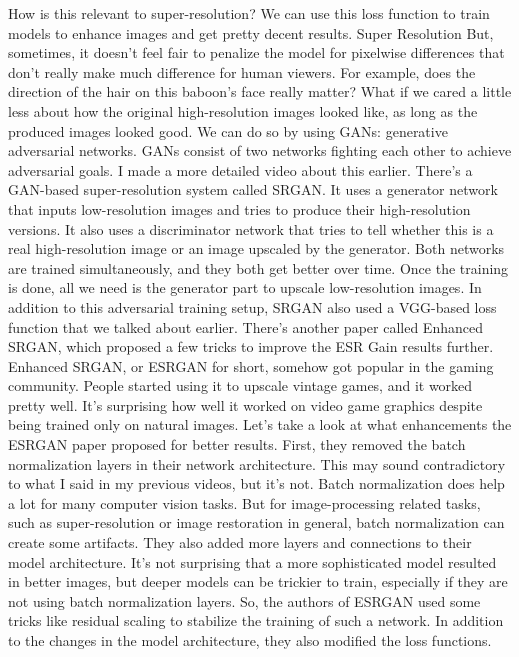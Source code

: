 How is this relevant to super-resolution?
We can use this loss function to train models to enhance images and get pretty decent results.
Super Resolution
But, sometimes, it doesn't feel fair to penalize the model for pixelwise differences that don't
really make much difference for human viewers.
For example, does the direction of the hair on this baboon's face really matter?
What if we cared a little less about how the original high-resolution images looked like,
as long as the produced images looked good.
We can do so by using GANs: generative adversarial networks.
GANs consist of two networks fighting each other to achieve adversarial goals.
I made a more detailed video about this earlier.
There's a GAN-based super-resolution system called SRGAN.
It uses a generator network that inputs low-resolution images and tries to produce their high-resolution
versions.
It also uses a discriminator network that tries to tell whether this is a real high-resolution
image or an image upscaled by the generator.
Both networks are trained simultaneously, and they both get better over time.
Once the training is done, all we need is the generator part to upscale low-resolution
images.
In addition to this adversarial training setup, SRGAN also used a VGG-based loss function
that we talked about earlier.
There's another paper called Enhanced SRGAN, which proposed a few tricks to improve the
ESR Gain
results further.
Enhanced SRGAN, or ESRGAN for short, somehow got popular in the gaming community.
People started using it to upscale vintage games, and it worked pretty well.
It's surprising how well it worked on video game graphics despite being trained only on
natural images.
Let's take a look at what enhancements the ESRGAN paper proposed for better results.
First, they removed the batch normalization layers in their network architecture.
This may sound contradictory to what I said in my previous videos, but it's not.
Batch normalization does help a lot for many computer vision tasks.
But for image-processing related tasks, such as super-resolution or image restoration in
general, batch normalization can create some artifacts.
They also added more layers and connections to their model architecture.
It's not surprising that a more sophisticated model resulted in better images, but deeper
models can be trickier to train, especially if they are not using batch normalization
layers.
So, the authors of ESRGAN used some tricks like residual scaling to stabilize the training
of such a network.
In addition to the changes in the model architecture, they also modified the loss functions.
